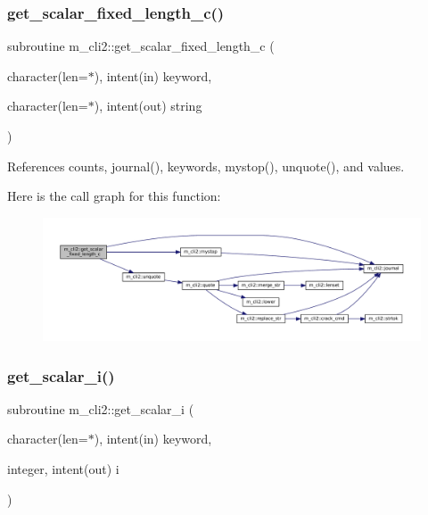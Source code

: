 \subsubsection{\texorpdfstring{get\+\_\+scalar\+\_\+fixed\+\_\+length\+\_\+c()}{get\_scalar\_fixed\_length\_c()}}
{\footnotesize\ttfamily subroutine m\+\_\+cli2\+::get\+\_\+scalar\+\_\+fixed\+\_\+length\+\_\+c (\begin{DoxyParamCaption}\item[{character(len=$\ast$), intent(in)}]{keyword,  }\item[{character(len=$\ast$), intent(out)}]{string }\end{DoxyParamCaption})\hspace{0.3cm}{\ttfamily [private]}}



References counts, journal(), keywords, mystop(), unquote(), and values.

Here is the call graph for this function\+:\nopagebreak
\begin{figure}[H]
\begin{center}
\leavevmode
\includegraphics[width=350pt]{namespacem__cli2_a9dcc99d34db1771959a1461274ae073e_cgraph}
\end{center}
\end{figure}
\mbox{\label{namespacem__cli2_a9c5208ef6763da7e68dd1e118bea0b7a}} 
\subsubsection{\texorpdfstring{get\+\_\+scalar\+\_\+i()}{get\_scalar\_i()}}
{\footnotesize\ttfamily subroutine m\+\_\+cli2\+::get\+\_\+scalar\+\_\+i (\begin{DoxyParamCaption}\item[{character(len=$\ast$), intent(in)}]{keyword,  }\item[{integer, intent(out)}]{i }\end{DoxyParamCaption})\hspace{0.3cm}{\ttfamily [private]}}



